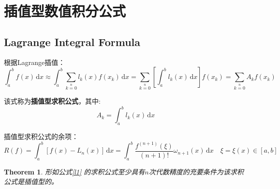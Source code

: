 \section{插值型数值积分公式}

\subsection{Lagrange Integral Formula}
根据Lagrange插值：
\begin{equation}\label{l1}
\int_a^b f(x)\,\mathrm{d}x \approx \int_a^b \sum\limits_{k=0}\limits^n l_k(x)f(x_k)\,\mathrm{d}x = \sum\limits_{k=0}\limits^n [\int_a^b l_k(x)\,\mathrm{d}x]f(x_k)= \sum\limits_{k=0}\limits^n A_k f(x_k)
\end{equation}

该式称为\textbf{插值型求积公式}，其中:
$$
A_k = \int_a^b l_k(x)\,\mathrm{d}x
$$

插值型求积公式的余项：
\begin{equation}
R(f) = \int_a^b [f(x) - L_n(x)]\,\mathrm{d}x = \int_a^b \frac{f^{(n+1)}(\xi)}{(n+1)!}\omega_{n+1}(x)\,\mathrm{d}x\quad \xi = \xi(x)\in [a,b]
\end{equation}

\newtheorem{thm3}{Theorem}[chapter]
\begin{thm3}
形如公式\ref{l1} 的求积公式至少具有$n$次代数精度的充要条件为该求积公式是插值型的。
\end{thm3}


